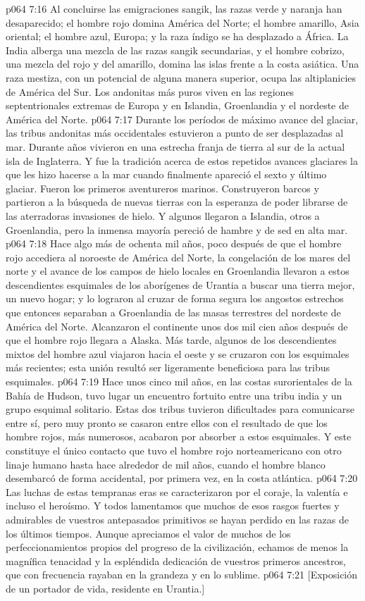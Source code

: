 \vs p064 7:16 Al concluirse las emigraciones sangik, las razas verde y naranja han desaparecido; el hombre rojo domina América del Norte; el hombre amarillo, Asia oriental; el hombre azul, Europa; y la raza índigo se ha desplazado a África. La India alberga una mezcla de las razas sangik secundarias, y el hombre cobrizo, una mezcla del rojo y del amarillo, domina las islas frente a la costa asiática. Una raza mestiza, con un potencial de alguna manera superior, ocupa las altiplanicies de América del Sur. Los andonitas más puros viven en las regiones septentrionales extremas de Europa y en Islandia, Groenlandia y el nordeste de América del Norte.
\vs p064 7:17 \pc Durante los períodos de máximo avance del glaciar, las tribus andonitas más occidentales estuvieron a punto de ser desplazadas al mar. Durante años vivieron en una estrecha franja de tierra al sur de la actual isla de Inglaterra. Y fue la tradición acerca de estos repetidos avances glaciares la que les hizo hacerse a la mar cuando finalmente apareció el sexto y último glaciar. Fueron los primeros aventureros marinos. Construyeron barcos y partieron a la búsqueda de nuevas tierras con la esperanza de poder librarse de las aterradoras invasiones de hielo. Y algunos llegaron a Islandia, otros a Groenlandia, pero la inmensa mayoría pereció de hambre y de sed en alta mar.
\vs p064 7:18 Hace algo más de ochenta mil años, poco después de que el hombre rojo accediera al noroeste de América del Norte, la congelación de los mares del norte y el avance de los campos de hielo locales en Groenlandia llevaron a estos descendientes esquimales de los aborígenes de Urantia a buscar una tierra mejor, un nuevo hogar; y lo lograron al cruzar de forma segura los angostos estrechos que entonces separaban a Groenlandia de las masas terrestres del nordeste de América del Norte. Alcanzaron el continente unos dos mil cien años después de que el hombre rojo llegara a Alaska. Más tarde, algunos de los descendientes mixtos del hombre azul viajaron hacia el oeste y se cruzaron con los esquimales más recientes; esta unión resultó ser ligeramente beneficiosa para las tribus esquimales.
\vs p064 7:19 Hace unos cinco mil años, en las costas surorientales de la Bahía de Hudson, tuvo lugar un encuentro fortuito entre una tribu india y un grupo esquimal solitario. Estas dos tribus tuvieron dificultades para comunicarse entre sí, pero muy pronto se casaron entre ellos con el resultado de que los hombre rojos, más numerosos, acabaron por absorber a estos esquimales. Y este constituye el único contacto que tuvo el hombre rojo norteamericano con otro linaje humano hasta hace alrededor de mil años, cuando el hombre blanco desembarcó de forma accidental, por primera vez, en la costa atlántica.
\vs p064 7:20 \pc Las luchas de estas tempranas eras se caracterizaron por el coraje, la valentía e incluso el heroísmo. Y todos lamentamos que muchos de esos rasgos fuertes y admirables de vuestros antepasados primitivos se hayan perdido en las razas de los últimos tiempos. Aunque apreciamos el valor de muchos de los perfeccionamientos propios del progreso de la civilización, echamos de menos la magnífica tenacidad y la espléndida dedicación de vuestros primeros ancestros, que con frecuencia rayaban en la grandeza y en lo sublime.
\vsetoff
\vs p064 7:21 [Exposición de un portador de vida, residente en Urantia.]
